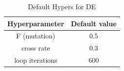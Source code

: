 \documentclass{IEEEtran}
\begin{document}
{{        \begin{table}[!hbp]
            \centering
            \begin{tabular}{|c|c|}
                \hline
                Hyperparameter & Default value \\
                \hline
                F (mutation) & 0.5 \\
                \hline
                cross rate & 0.3 \\
                \hline
                loop iterations & 600 \\
                \hline
            \end{tabular}
            \caption{Default Hypers for DE}
            \label{tab:hyper_DE_Q1}
        \end{table}

        
    }
}



\end{document}
